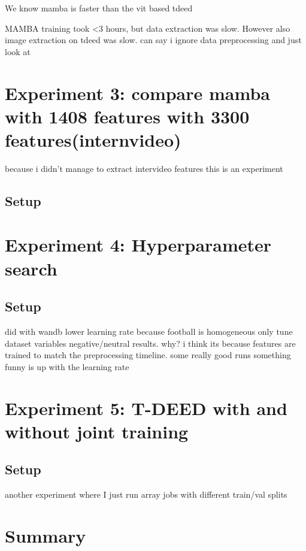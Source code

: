 We know mamba is faster than the vit based tdeed

MAMBA training took <3 hours, but data extraction was slow. However also image extraction on tdeed was slow. can say i ignore data preprocessing and just look at 


\section{Experiment 3: compare mamba with 1408 features with 3300 features(internvideo)}
because i didn't manage to extract intervideo features this is an experiment


\subsection{Setup}
\label{ssec:ex3_setup}

\section{Experiment 4: Hyperparameter search}
\subsection{Setup}
\label{ssec:ex4_setup}

did with wandb
lower learning rate because football is homogeneous
only tune dataset variables
negative/neutral results. why? i think its because features are trained to match the preprocessing timeline. some really good runs
something funny is up with the learning rate

\section{Experiment 5: T-DEED with and without joint training}
\subsection{Setup}
\label{ssec:ex5_setup}

another experiment where I just run array jobs with different train/val splits

\section{Summary}

